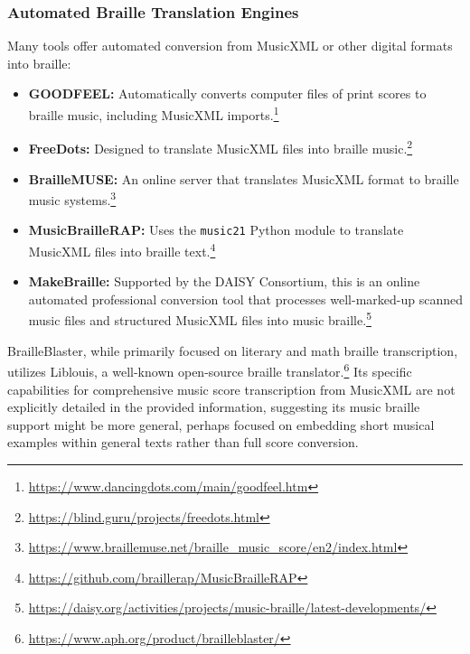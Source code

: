 \subsubsection{Automated Braille Translation Engines}
Many tools offer automated conversion from MusicXML or other digital formats into braille:
\begin{itemize}[noitemsep,topsep=0pt]
    \item \textbf{GOODFEEL:} Automatically converts computer files of print scores to braille music, including MusicXML imports.\footnote{\url{https://www.dancingdots.com/main/goodfeel.htm}}
    \item \textbf{FreeDots:} Designed to translate MusicXML files into braille music.\footnote{\url{https://blind.guru/projects/freedots.html}}
    \item \textbf{BrailleMUSE:} An online server that translates MusicXML format to braille music systems.\footnote{\url{https://www.braillemuse.net/braille_music_score/en2/index.html}}
    \item \textbf{MusicBrailleRAP:} Uses the \texttt{music21} Python module to translate MusicXML files into braille text.\footnote{\url{https://github.com/braillerap/MusicBrailleRAP}}
    \item \textbf{MakeBraille:} Supported by the DAISY Consortium, this is an online automated professional conversion tool that processes well-marked-up scanned music files and structured MusicXML files into music braille.\footnote{\url{https://daisy.org/activities/projects/music-braille/latest-developments/}}
\end{itemize}

BrailleBlaster, while primarily focused on literary and math braille transcription, utilizes Liblouis, a well-known open-source braille translator.\footnote{\url{https://www.aph.org/product/brailleblaster/}} Its specific capabilities for comprehensive music score transcription from MusicXML are not explicitly detailed in the provided information, suggesting its music braille support might be more general, perhaps focused on embedding short musical examples within general texts rather than full score conversion.

